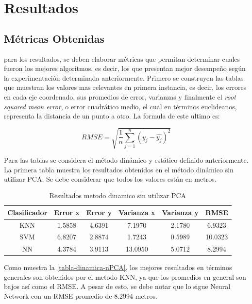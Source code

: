 \chapter{Resultados}

\section{Métricas Obtenidas}

para los resultados, se deben elaborar métricas que permitan determinar cuales fueron los mejores algoritmos, es decir, los que presentan mejor desempeño según la experimentación determinada anteriormente. Primero se construyen las tablas que muestran los valores mas relevantes en primera instancia, es decir, los errores en cada eje coordenado, sus promedios de error, varianzas y finalmente el \textit{root squared mean error}, o error cuadrático medio, el cual en términos euclideanos, representa la distancia de un punto a otro. La formula de este ultimo es:

$$ RMSE = \sqrt{\frac{1}{n} \sum_{j=1}^{n}(y_{j} - \hat{y_{j}})^{2}} $$

Para las tablas se considera el método dinámico y estático definido anteriormente. La primera tabla muestra los resultados obtenidos en el método dinámico sin utilizar PCA. Se debe considerar que todos los valores están en metros.


\begin{table}[!h]
\centering
\caption{Resultados metodo dinamico sin  utilizar PCA}
\label{tabla-dinamica-nPCA}
\begin{tabular}{|c|c|c|c|c|c|}
\hline
Clasificador & Error x & Error y & Varianza x & Varianza y & RMSE    \\ \hline
KNN          & 1.5858  & 4.6391  & 7.1970     & 2.1780     & 6.9323  \\ \hline
SVM          & 6.8207  & 2.8874  & 1.7243     & 0.5989     & 10.0323 \\ \hline
NN           & 4.3784  & 3.9113  & 13.0950    & 5.0712     & 8.2994  \\ \hline
\end{tabular}
\end{table}


Como muestra la \autoref{tabla-dinamica-nPCA}, los mejores resultados en términos generales son obtenidos por el metodo KNN, ya que los promedios en general son bajos así como el RMSE. A pesar de esto, se debe notar que lo sigue Neural Network con un RMSE promedio de 8.2994 metros. 

